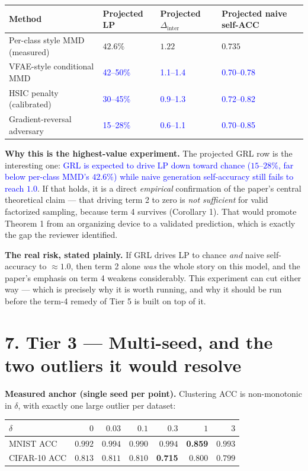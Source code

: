 \documentclass[10pt,letterpaper]{article}
\newcommand{\pj}[1]{\textcolor{blue}{#1}}
\begin{document}
\begin{table}[h]
\centering
\small
\begin{tabular}{llll}
\toprule
Method & Projected LP & Projected $\Delta_{\mathrm{inter}}$ & Projected naive self-ACC \\
\midrule
Per-class style MMD (measured) & $42.6\%$ & $1.22$ & $0.735$ \\
VFAE-style conditional MMD & \pj{42--50\%} & \pj{1.1--1.4} & \pj{0.70--0.78} \\
HSIC penalty (calibrated)  & \pj{30--45\%} & \pj{0.9--1.3} & \pj{0.72--0.82} \\
Gradient-reversal adversary & \pj{15--28\%} & \pj{0.6--1.1} & \pj{0.70--0.85} \\
\bottomrule
\end{tabular}
\end{table}

\textbf{Why this is the highest-value experiment.} The projected GRL row is
the interesting one: \pj{GRL is expected to drive LP down toward chance
($15$--$28\%$, far below per-class MMD's $42.6\%$) while naive generation
self-accuracy still fails to reach $1.0$}. If that holds, it is a direct
\emph{empirical} confirmation of the paper's central theoretical claim ---
that driving term 2 to zero is \emph{not sufficient} for valid factorized
sampling, because term 4 survives (Corollary 1). That would promote
Theorem 1 from an organizing device to a validated prediction, which is
exactly the gap the reviewer identified.

\textbf{The real risk, stated plainly.} If GRL drives LP to chance
\emph{and} naive self-accuracy to $\approx1.0$, then term 2 alone
\emph{was} the whole story on this model, and the paper's emphasis on term 4
weakens considerably. This experiment can cut either way --- which is
precisely why it is worth running, and why it should be run before the term-4
remedy of Tier 5 is built on top of it.

\section*{7. Tier 3 --- Multi-seed, and the two outliers it would resolve}

\textbf{Measured anchor (single seed per point).} Clustering ACC is
non-monotonic in $\delta$, with exactly one large outlier per dataset:

\begin{center}\small
\begin{tabular}{lrrrrrr}
\toprule
$\delta$ & $0$ & $0.03$ & $0.1$ & $0.3$ & $1$ & $3$ \\
\midrule
MNIST ACC    & $0.992$ & $0.994$ & $0.990$ & $0.994$ & \textbf{0.859} & $0.993$ \\
CIFAR-10 ACC & $0.813$ & $0.811$ & $0.810$ & \textbf{0.715} & $0.800$ & $0.799$ \\
\bottomrule
\end{tabular}
\end{center}
\end{document}
